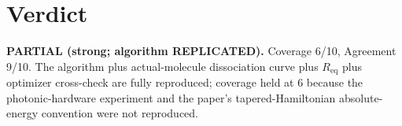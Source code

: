 \documentclass[11pt]{article}
\begin{document}
\section{Verdict}
\textbf{PARTIAL (strong; algorithm REPLICATED).} Coverage 6/10, Agreement 9/10. The algorithm plus actual-molecule dissociation curve plus $R_\mathrm{eq}$ plus optimizer cross-check are fully reproduced; coverage held at 6 because the photonic-hardware experiment and the paper's tapered-Hamiltonian absolute-energy convention were not reproduced.


\end{document}
